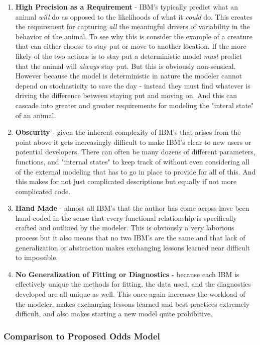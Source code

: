 \documentclass[11pt]{article}
\begin{document}
\begin{enumerate}
\item \textbf{High Precision as a Requirement} - IBM's typically predict what an animal \textit{will} do as opposed to the likelihoods of what it \textit{could} do. This creates the requirement for capturing \textit{all} the meaningful drivers of variability in the behavior of the animal. To see why this is consider the example of a creature that can either choose to stay put or move to another location. If the more likely of the two actions is to stay put a deterministic model \textit{must} predict that the animal will \textit{always} stay put. But this is obviously non-sensical. However because the model is deterministic in nature the modeler cannot depend on stochasticity to save the day - instead they must find whatever is driving the difference between staying put and moving on. And this can cascade into greater and greater requirements for modeling the "interal state" of an animal. 
\item \textbf{Obscurity} - given the inherent complexity of IBM's that arises from the point above it gets increasingly difficult to make IBM's clear to new users or potential developers. There can often be many dozens of different parameters, functions, and "internal states" to keep track of without even considering all of the external modeling that has to go in place to provide for all of this. And this makes for not just complicated descriptions but equally if not more complicated code.
\item \textbf{Hand Made} - almost all IBM's that the author has come across have been hand-coded in the sense that every functional relationship is specifically crafted and outlined by the modeler. This is obviously a very laborious process but it also means that no two IBM's are the same and that lack of generalization or abstraction makes exchanging lessons learned near difficult to impossible. 
\item \textbf{No Generalization of Fitting or Diagnostics} - because each IBM is effectively unique the methods for fitting, the data used, and the diagnostics developed are all unique as well. This once again increases the workload of the modeler, makes exchanging lessons learned and best practices extremely difficult, and also makes starting a new model quite prohibitive. 
\end{enumerate}

\subsubsection{Comparison to Proposed Odds Model}
\end{document}
